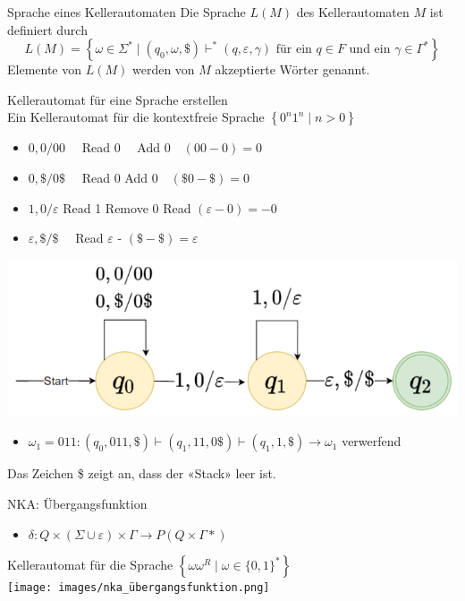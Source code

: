 \begin{definition}{Sprache eines Kellerautomaten}
    Die Sprache $L(M)$ des Kellerautomaten $M$ ist definiert durch
    $$
    L(M)=\left\{\omega \in \Sigma^{*} \mid\left(q_{0}, \omega, \$\right) \vdash^{*}(q, \varepsilon, \gamma) \text { für ein } q \in F \text { und ein } \gamma \in \Gamma^{*}\right\}
    $$
    Elemente von $L(M)$ werden von $M$ akzeptierte Wörter genannt.
\end{definition}

\begin{KR}{Kellerautomat für eine Sprache erstellen}\\
    Ein Kellerautomat für die kontextfreie Sprache $\left\{0^{n} 1^{n} \mid n>0\right\}$
    \begin{itemize}
    \item $0,0 / 00 \quad$ Read $0 \quad$ Add $0 \quad(00-0)=0$
    \item $0, \$ / 0 \$ \quad$ Read 0 Add $0 \quad(\$ 0-\$)=0$
    \item $1,0 / \varepsilon$ Read 1 Remove 0 Read $(\varepsilon-0)=-0$
    \item $\varepsilon, \$ / \$ \quad$ Read $\varepsilon$ - $(\$-\$)=\varepsilon$
    \end{itemize}
    \includegraphics[width=0.3\linewidth]{images/kellerautomat_sprache.png}
    \begin{itemize}
        \item $\omega_{1}=011:\left(q_{0}, 011, \$\right) \vdash\left(q_{1}, 11,0 \$\right) \vdash\left(q_{1}, 1, \$\right) \rightarrow \omega_{1}$ verwerfend
    \end{itemize}
    Das Zeichen \$ zeigt an, dass der «Stack» leer ist.
\end{KR}

\begin{concept}{NKA: Übergangsfunktion}
    \begin{itemize}
        \item $\delta: Q \times(\Sigma \cup \varepsilon) \times \Gamma \rightarrow P(Q \times \Gamma *)$
    \end{itemize}
    Kellerautomat für die Sprache $\left\{\omega \omega^{R} \mid \omega \in\{0,1\}^{*}\right\}$\\
    \texttt{[image: images/nka\_übergangsfunktion.png]}
\end{concept}